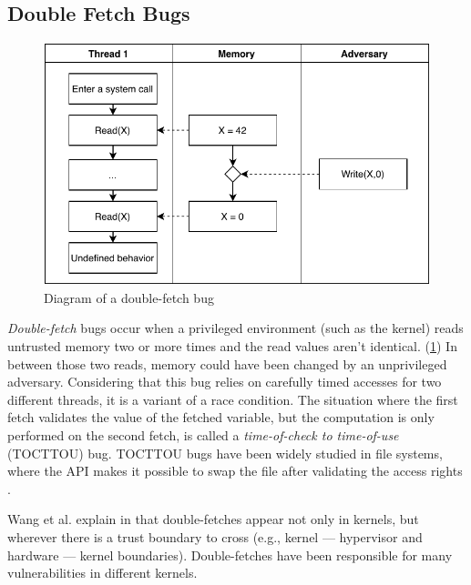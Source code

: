 \subsection{Double Fetch Bugs}
\label{subsec:doublefetch}


\begin{figure}[]
  \centering
  \includegraphics[width=.85\linewidth]{img/doublefetch.pdf}
  \caption{Diagram of a double-fetch bug}
  \label{fig:doublefetch}
\end{figure}

\emph{Double-fetch} bugs occur when a privileged environment (such as the
kernel) reads untrusted memory two or more times and the read values aren't
identical. (\cref{fig:doublefetch}) In between those two reads, memory could
have been changed by an unprivileged adversary. Considering that this bug relies
on carefully timed accesses for two different threads, it is a variant of a race
condition. The situation where the first fetch validates the value of the
fetched variable, but the computation is only performed on the second fetch, is
called a \emph{time-of-check to time-of-use} (TOCTTOU) bug. TOCTTOU bugs have
been widely studied in file systems, where the API makes it possible to swap the
file after validating the access rights \cite{payer2012protecting,
pu2006methodical, wei2010modeling, tsafrir2008portably}.

Wang et al. explain in \cite{wang2018survey} that double-fetches appear not only
in kernels, but wherever there is a trust boundary to cross (e.g., kernel ---
hypervisor\cite{wilhelm2016xenpwn} and hardware --- kernel
boundaries\cite{lu2018untrusted}). Double-fetches have been responsible for many
vulnerabilities in different kernels\cite{jurczyk2013bochspwn, wang2018survey}.

